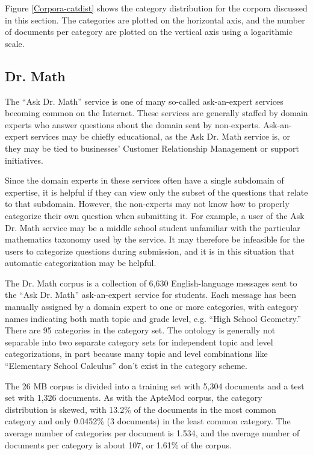 Figure \ref{Corpora-catdist} shows the category distribution for
the corpora discussed in this section.  The categories are plotted on
the horizontal axis, and the number of documents per category are
plotted on the vertical axis using a logarithmic scale.


\subsection{Dr. Math}

The ``Ask Dr. Math'' service \cite{drmath} is one of many so-called
ask-an-expert services becoming common on the Internet.  These
services are generally staffed by domain experts who answer questions
about the domain sent by non-experts.  Ask-an-expert services may be
chiefly educational, as the Ask Dr. Math service is, or they may be
tied to businesses' Customer Relationship Management or support
initiatives.

Since the domain experts in these services often have a single
subdomain of expertise, it is helpful if they can view only the subset
of the questions that relate to that subdomain.  However, the
non-experts may not know how to properly categorize their own question
when submitting it.  For example, a user of the Ask Dr. Math service
may be a middle school student unfamiliar with the particular
mathematics taxonomy used by the service.  It may therefore be
infeasible for the users to categorize questions during submission,
and it is in this situation that automatic categorization may be
helpful.

The Dr. Math corpus is a collection of 6,630 English-language messages
sent to the ``Ask Dr. Math'' ask-an-expert service for
students. \cite{drmath} Each message has been manually assigned by a
domain expert to one or more categories,
with category names indicating both math topic and grade level,
e.g. ``High School Geometry.''  There are 95 categories in the
category set.  The ontology is generally not
separable into two separate category sets for independent topic and
level categorizations, in part because many topic and level
combinations like ``Elementary School Calculus'' don't exist in the
category scheme.

The 26 MB corpus is divided into a training set with 5,304 documents
and a test set with 1,326 documents.  As with the ApteMod corpus, the
category distribution is skewed, with 13.2\% of the documents in the
most common category and only 0.0452\% (3 documents) in the least
common category.  The average number of categories per document is
1.534, and the average number of documents per category is about 107,
or 1.61\% of the corpus.

